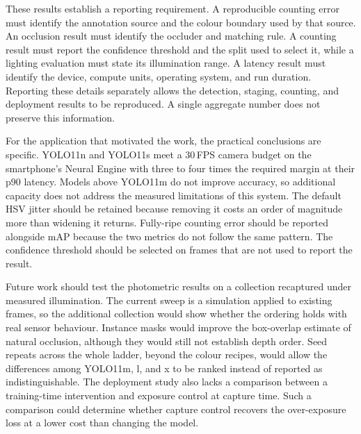 These results establish a reporting requirement. A reproducible counting error
must identify the annotation source and the colour boundary used by that
source. An occlusion result must identify the occluder and matching rule. A
counting result must report the confidence threshold and the split used to
select it, while a lighting evaluation must state its illumination range. A
latency result must identify the device, compute units, operating system, and
run duration. Reporting these details separately allows the detection, staging,
counting, and deployment results to be reproduced. A single aggregate number
does not preserve this information.

For the application that motivated the work, the practical conclusions are
specific. YOLO11n and YOLO11s meet a 30\,FPS camera budget on the smartphone's
Neural Engine with three to four times the required margin at their p90
latency. Models above YOLO11m do not improve accuracy, so additional capacity
does not address the measured limitations of this system. The default HSV
jitter should be retained because removing it costs an order of magnitude more
than widening it returns. Fully-ripe counting error should be reported alongside
mAP because the two metrics do not follow the same pattern. The confidence
threshold should be selected on frames that are not used to report the result.

Future work should test the photometric results on a collection recaptured under
measured illumination. The current sweep is a simulation applied to existing
frames, so the additional collection would show whether the ordering holds with
real sensor behaviour. Instance masks would improve the box-overlap estimate of
natural occlusion, although they would still not establish depth order. Seed
repeats across the whole ladder, beyond the colour recipes, would allow the
differences among YOLO11m, l, and x to be ranked instead of reported as
indistinguishable. The deployment study also lacks a comparison between a
training-time intervention and exposure control at capture time. Such a
comparison could determine whether capture control recovers the over-exposure
loss at a lower cost than changing the model.
